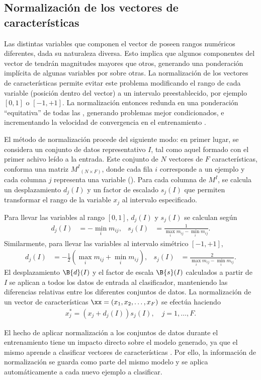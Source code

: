 %
%
%
\subsection{Normalización de los vectores de características}
%
Las distintas variables que componen el vector de 
poseen rangos numéricos diferentes, dada su naturaleza diversa.
Esto implica que algunos componentes del vector de 
tendrán magnitudes mayores que otros, generando una ponderación
implícita de algunas variables por sobre otras.
La normalización de los vectores de características permite evitar
este problema modificando el rango de cada variable (posición dentro
del vector) a un intervalo preestablecido, por ejemplo $[0,1]$ o
$[-1,+1]$.
La normalización entonces redunda en una ponderación ``equitativa'' de
todas las , generando problemas mejor condicionados, e
incrementando la velocidad de convergencia en el entrenamiento
\cite{nnfaq2}.

El método de normalización procede del siguiente modo: en
primer lugar, se considera un conjunto de datos representativo
$I$, tal como aquel formado con el primer achivo leído a la entrada.
Este conjunto de ${N}$ vectores de $F$ características, conforma una
matriz $M^I{}_{({N}\times{}F)}$, donde cada fila $i$ corresponde
a un ejemplo y cada columna $j$ representa una variable
(\caract{}). Para cada columna de $M^I$, se calcula un desplazamiento
$d_j(I)$ y un factor de escalado $s_j(I)$ que permiten transformar el
rango de la variable $x_j$ al intervalo especificado.

Para llevar las variables al rango $[0,1]$, $d_j(I)$ y $s_j(I)$ se
calculan según
%
\begin{align}
  d_j(I) &= - \min_i m_{ij}, &
  s_j(I) &= \frac{1}{\max_i m_{ij} - \min_i m_{ij}}.
\end{align}
%
Similarmente, para llevar las variables al intervalo simétrico
$[-1,+1]$,
%
\begin{align}
  d_j(I) &= -\frac{1}{2}\left(\max_i m_{ij} + \min_i m_{ij}\right), &
  s_j(I) &= \frac{2}{\max_i m_{ij} - \min_i m_{ij}}.
\end{align}
%
El desplazamiento $\B{d}(I)$ y el factor de escala $\B{s}(I)$
calculados a partir de $I$ se aplican a todos los datos
de entrada al clasificador, manteniendo las diferencias relativas
entre los diferentes conjuntos de datos. La normalización de un
vector de características $\xx=(x_{1},x_{2},\ldots,x_{F})$ se
efectúa haciendo
%
\begin{align}
  x_j^{*} = ( x_j + d_j(I) ) s_j(I), \quad j=1,\ldots,F.
\end{align}
%

El hecho de aplicar normalización a los conjuntos de datos durante el
entrenamiento tiene un impacto directo sobre el modelo generado, ya
que el mismo aprende a clasificar vectores de características
. Por ello, la información de normalización se guarda
como parte del mismo modelo y se aplica automáticamente a cada nuevo
ejemplo a clasificar.
